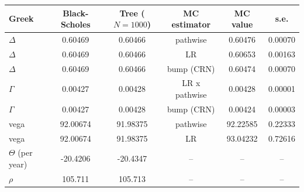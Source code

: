 \begin{tabular}{lccccc}
\toprule
Greek & Black-Scholes & Tree ($N=1000$) & MC estimator & MC value & s.e. \\
\midrule
$\Delta$ & 0.60469 & 0.60466 & pathwise & 0.60476 & 0.00070 \\
$\Delta$ & 0.60469 & 0.60466 & LR & 0.60653 & 0.00163 \\
$\Delta$ & 0.60469 & 0.60466 & bump (CRN) & 0.60474 & 0.00070 \\
$\Gamma$ & 0.00427 & 0.00428 & LR x pathwise & 0.00428 & 0.00001 \\
$\Gamma$ & 0.00427 & 0.00428 & bump (CRN) & 0.00424 & 0.00003 \\
vega & 92.00674 & 91.98375 & pathwise & 92.22585 & 0.22333 \\
vega & 92.00674 & 91.98375 & LR & 93.04232 & 0.72616 \\
$\Theta$ (per year) & -20.4206 & -20.4347 & -- & -- & -- \\
$\rho$ & 105.711 & 105.713 & -- & -- & -- \\
\bottomrule
\end{tabular}
